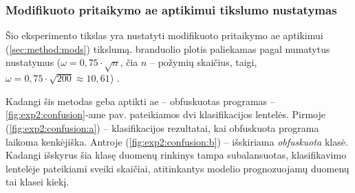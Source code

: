 \subsubsection{Modifikuoto \LIME pritaikymo \gls{ae} aptikimui tikslumo nustatymas}\label{sec:exp:2}

Šio eksperimento tikslas yra nustatyti modifikuoto \LIME pritaikymo \gls{ae} aptikimui (\ref{sec:method:mods}) tikslumą. \LIME branduolio plotis paliekamas pagal numatytus nustatymus ($\omega = 0,75 \cdot \sqrt{n}$, čia $n$ -- požymių skaičius, taigi, $\omega = 0,75 \cdot \sqrt{200} \approx 10,61$) \cite{ribeiroWhyShouldTrust2016}.

Kadangi šis metodas geba aptikti \gls{ae} -- obfuskuotas programas --
\ref{fig:exp2:confusion}-ame pav. pateikiamos dvi klasifikacijos lentelės. Pirmoje (\ref{fig:exp2:confusion:a}) -- klasifikacijos rezultatai, kai obfuskuota programa laikoma kenkėjiška. Antroje (\ref{fig:exp2:confusion:b}) -- išskiriama \textit{obfuskuota} klasė. Kadangi išskyrus šia klasę duomenų rinkinys tampa subalansuotas, klasifikavimo lentelėje pateikiami sveiki skaičiai, atitinkantys modelio prognozuojamų duomenų tai klasei kiekį.

